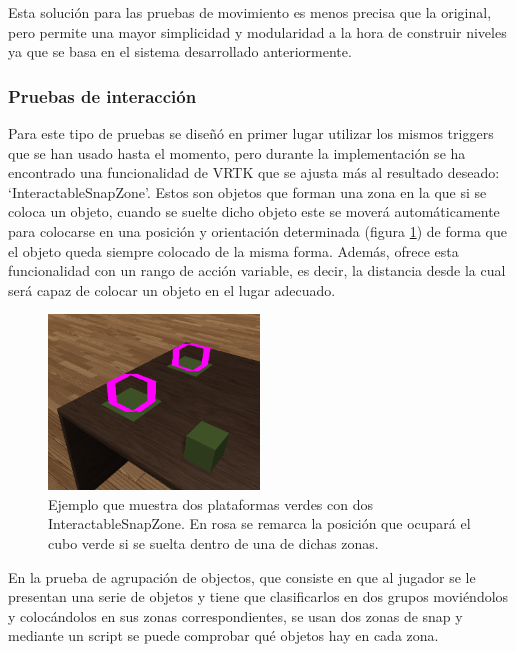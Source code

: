 Esta solución para las pruebas de movimiento es menos precisa que la original, pero permite una mayor simplicidad y modularidad a la hora de construir niveles ya que se basa en el sistema desarrollado anteriormente.


\subsubsection{Pruebas de interacción}


Para este tipo de pruebas se diseñó en primer lugar utilizar los mismos triggers que se han usado hasta el momento, pero durante la implementación se ha encontrado una funcionalidad de VRTK que se ajusta más al resultado deseado: ‘InteractableSnapZone’. Estos son objetos que forman una zona en la que si se coloca un objeto, cuando se suelte dicho objeto este se moverá automáticamente para colocarse en una posición y orientación determinada (figura \ref{fig:E2_snapHighLights}) de forma que el objeto queda siempre colocado de la misma forma. Además, ofrece esta funcionalidad con un rango de acción variable, es decir, la distancia desde la cual será capaz de colocar un objeto en el lugar adecuado. 


\begin{figure}
  \centering
    \includegraphics[width=0.5\textwidth]{04.Desarrollo/02.Entrega2/02.Iteracion2_2/00.Figuras/06.snap_highlights.png}
    \caption{Ejemplo que muestra dos plataformas verdes con dos InteractableSnapZone. En rosa se remarca la posición que ocupará el cubo verde si se suelta dentro de una de dichas zonas.}
    \label{fig:E2_snapHighLights}
\end{figure}

En la prueba de agrupación de objectos, que consiste en que al jugador se le presentan una serie de objetos y tiene que clasificarlos en dos grupos moviéndolos y colocándolos en sus zonas correspondientes, se usan dos zonas de snap y mediante un script se puede comprobar qué objetos hay en cada zona.



